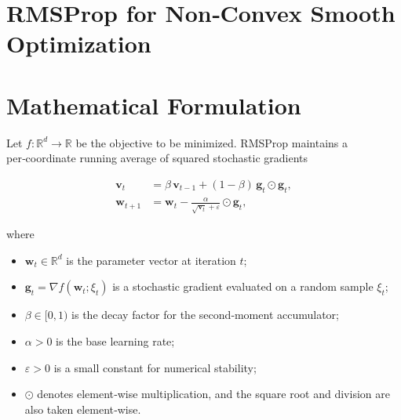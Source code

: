 \documentclass{article}
\begin{document}
\section*{RMSProp for Non‑Convex Smooth Optimization}

\section*{Mathematical Formulation}
Let $f:\mathbb{R}^{d}\rightarrow\mathbb{R}$ be the objective to be minimized.  
RMSProp maintains a per‑coordinate running average of squared stochastic gradients

\[
\boxed{
\begin{aligned}
\bm v_{t} & = \beta\,\bm v_{t-1} + (1-\beta)\,\bm g_{t}\odot\bm g_{t},
\\[2mm]
\bm w_{t+1} & = \bm w_{t} - \frac{\alpha}{\sqrt{\bm v_{t}}+\varepsilon}\odot\bm g_{t},
\end{aligned}}
\tag{1}
\]

where  

\begin{itemize}
\item $\bm w_{t}\in\mathbb{R}^{d}$ is the parameter vector at iteration $t$;
\item $\bm g_{t}= \nabla f(\bm w_{t};\xi_{t})$ is a stochastic gradient evaluated on a random sample $\xi_{t}$;
\item $\beta\in[0,1)$ is the decay factor for the second‑moment accumulator;
\item $\alpha>0$ is the base learning rate;
\item $\varepsilon>0$ is a small constant for numerical stability;
\item $\odot$ denotes element‑wise multiplication, and the square root and division are also taken element‑wise.
\end{itemize}
\end{document}
